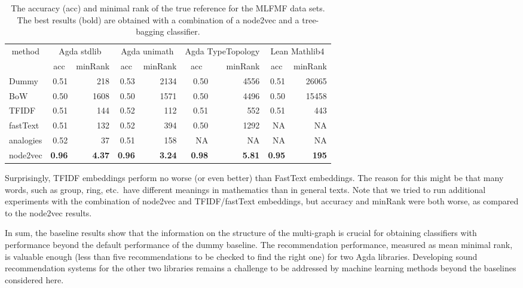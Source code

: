 \documentclass{article}
\begin{document}
\begin{table}[htbp]
  \caption{The accuracy (acc) and minimal rank of the true reference for the MLFMF data sets. The best results (bold) are obtained with a combination of a node2vec and a tree-bagging classifier.}
  \smallskip
  \centering
    \begin{tabular}{l|rr|rr|rr|rr}
    \multicolumn{1}{c|}{\multirow{2}[4]{*}{method}} & \multicolumn{2}{c|}{Agda stdlib} & \multicolumn{2}{c|}{Agda unimath} & \multicolumn{2}{c|}{Agda TypeTopology}  & \multicolumn{2}{c}{Lean Mathlib4} \\
    & \multicolumn{1}{c}{acc} & \multicolumn{1}{c|}{minRank} & \multicolumn{1}{c}{acc} & \multicolumn{1}{c|}{minRank} & \multicolumn{1}{c}{acc} & \multicolumn{1}{r|}{minRank} & \multicolumn{1}{c}{acc} & \multicolumn{1}{c}{minRank} \\
    \hline
    Dummy & 0.51  & 218   & 0.53 &  2134  & 0.50  & 4556    & 0.51    & 26065  \\
    BoW   & 0.50      & 1608  & 0.50  & 1571  & 0.50  &  4496     &   0.50    & 15458  \\
    TFIDF & 0.51    & 144   & 0.52  & 112   & 0.51  & 552   &   0.51    & 443  \\
    fastText &  0.51   & 132   & 0.52  & 394   &  0.50    & 1292      &  NA     & NA  \\
    analogies & 0.52      & 37    & 0.51  & 158   &  NA     &  NA     &   NA    & NA  \\
    node2vec & \textbf{0.96} & \textbf{4.37} & \textbf{0.96} & \textbf{3.24} & \textbf{0.98} & \textbf{5.81}  &   \textbf{0.95}    & \textbf{195} \\
    \end{tabular}%
  \label{tab:ressults}%
\end{table}%

Surprisingly, TFIDF embeddings perform no worse (or even better) than FastText embeddings. The reason for this might be that many words, such as group, ring, etc.~have different meanings in mathematics than in general texts. Note that we tried to run additional experiments with the combination of node2vec and TFIDF/fastText embeddings, but accuracy and minRank were both worse, as compared to the node2vec results.

In sum, the baseline results show that the information on the structure of the multi-graph is crucial for obtaining classifiers with performance beyond the default performance of the dummy baseline. The recommendation performance, measured as mean minimal rank, is valuable enough (less than five recommendations to be checked to find the right one) for two Agda libraries. Developing sound recommendation systems for the other two libraries remains a challenge to be addressed by machine learning methods beyond the baselines considered here.
\end{document}
